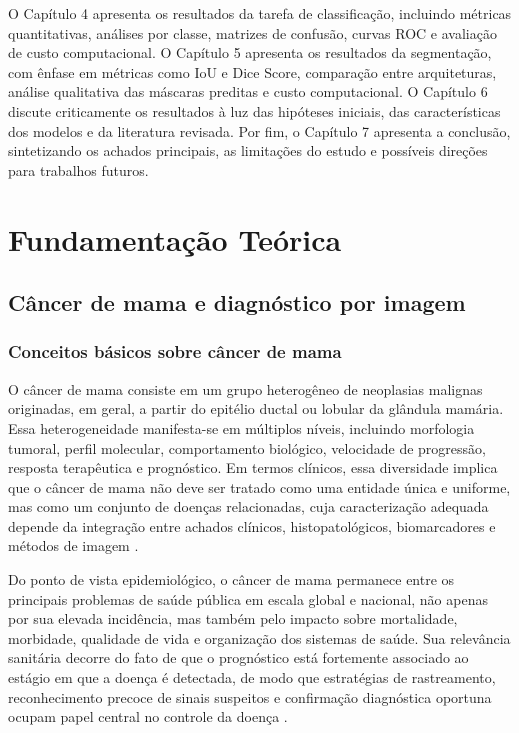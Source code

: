 \documentclass[tcc,capa]{texufpel}
\begin{document}
O Capítulo 4 apresenta os resultados da tarefa de classificação, incluindo métricas quantitativas, análises por classe, matrizes de confusão, curvas ROC e avaliação de custo computacional. O Capítulo 5 apresenta os resultados da segmentação, com ênfase em métricas como IoU e Dice Score, comparação entre arquiteturas, análise qualitativa das máscaras preditas e custo computacional. O Capítulo 6 discute criticamente os resultados à luz das hipóteses iniciais, das características dos modelos e da literatura revisada. Por fim, o Capítulo 7 apresenta a conclusão, sintetizando os achados principais, as limitações do estudo e possíveis direções para trabalhos futuros.

\chapter{Fundamentação Teórica}

\section{Câncer de mama e diagnóstico por imagem}

\subsection{Conceitos básicos sobre câncer de mama}

O câncer de mama consiste em um grupo heterogêneo de neoplasias malignas originadas, em geral, a partir do epitélio ductal ou lobular da glândula mamária. Essa heterogeneidade manifesta-se em múltiplos níveis, incluindo morfologia tumoral, perfil molecular, comportamento biológico, velocidade de progressão, resposta terapêutica e prognóstico. Em termos clínicos, essa diversidade implica que o câncer de mama não deve ser tratado como uma entidade única e uniforme, mas como um conjunto de doenças relacionadas, cuja caracterização adequada depende da integração entre achados clínicos, histopatológicos, biomarcadores e métodos de imagem \cite{WHO2025BreastCancer,INCAEstimativa2023}.

Do ponto de vista epidemiológico, o câncer de mama permanece entre os principais problemas de saúde pública em escala global e nacional, não apenas por sua elevada incidência, mas também pelo impacto sobre mortalidade, morbidade, qualidade de vida e organização dos sistemas de saúde. Sua relevância sanitária decorre do fato de que o prognóstico está fortemente associado ao estágio em que a doença é detectada, de modo que estratégias de rastreamento, reconhecimento precoce de sinais suspeitos e confirmação diagnóstica oportuna ocupam papel central no controle da doença \cite{WHO2025BreastCancer,INCADiretrizesMama}.
\end{document}
